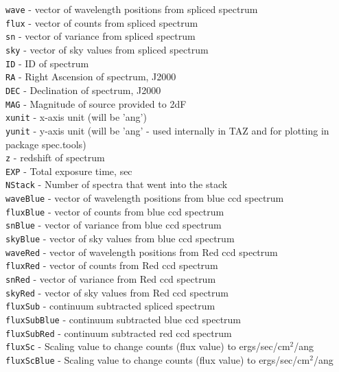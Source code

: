 \documentclass[12pt]{article}
\begin{document}
\texttt{wave} - vector of wavelength positions from spliced spectrum \\
\texttt{flux} - vector of counts from spliced spectrum \\
\texttt{sn} - vector of variance from spliced spectrum \\
\texttt{sky} - vector of sky values from spliced spectrum \\
\texttt{ID} - ID of spectrum \\
\texttt{RA} - Right Ascension of spectrum, J2000 \\
\texttt{DEC} - Declination of spectrum, J2000 \\ 
\texttt{MAG} - Magnitude of source provided to 2dF \\
\texttt{xunit} - x-axis unit (will be 'ang') \\
\texttt{yunit} - y-axis unit (will be 'ang' - used internally in TAZ and for plotting in package spec.tools) \\
\texttt{z} - redshift of spectrum  \\
\texttt{EXP} - Total exposure time, sec \\
\texttt{NStack} - Number of spectra that went into the stack\\
\texttt{waveBlue} - vector of wavelength positions from blue ccd spectrum\\
\texttt{fluxBlue} - vector of counts from blue ccd spectrum\\
\texttt{snBlue} - vector of variance from blue ccd spectrum\\
\texttt{skyBlue} - vector of sky values from blue ccd spectrum\\
\texttt{waveRed} - vector of wavelength positions from Red ccd spectrum\\
\texttt{fluxRed} - vector of counts from Red ccd spectrum\\
\texttt{snRed} - vector of variance from Red ccd spectrum\\
\texttt{skyRed} - vector of sky values from Red ccd spectrum\\
\texttt{fluxSub} - continuum subtracted spliced spectrum \\
\texttt{fluxSubBlue} - continuum subtracted blue ccd spectrum \\
\texttt{fluxSubRed} - continuum subtracted red ccd spectrum \\
\texttt{fluxSc} - Scaling value to change counts (flux value) to ergs/sec/cm$^2$/ang\\
\texttt{fluxScBlue} - Scaling value to change counts (flux value) to ergs/sec/cm$^2$/ang\\
\end{document}
